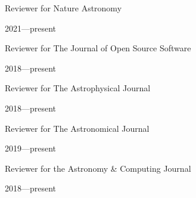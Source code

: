 \documentclass[12pt, a4paper]{article} %
\begin{document}
\vspace{0.2cm}

\begin{minipage}[t]{0.7\textwidth}
\begin{flushleft}%
  \setlength{\leftskip}{0.2cm}%
Reviewer for Nature Astronomy
\end{flushleft}
\end{minipage}
\begin{minipage}[t]{0.3\textwidth}
\hfill 2021---present
\end{minipage}

\vspace{0.2cm}

\begin{minipage}[t]{0.7\textwidth}
\begin{flushleft}%
  \setlength{\leftskip}{0.2cm}%
Reviewer for The Journal of Open Source Software
\end{flushleft}
\end{minipage}
\begin{minipage}[t]{0.3\textwidth}
\hfill 2018---present
\end{minipage}

\vspace{0.2cm}

\begin{minipage}[t]{0.7\textwidth}
\begin{flushleft}%
  \setlength{\leftskip}{0.2cm}%
Reviewer for The Astrophysical Journal
\end{flushleft}
\end{minipage}
\begin{minipage}[t]{0.3\textwidth}
\hfill 2018---present
\end{minipage}

\vspace{0.2cm}

\begin{minipage}[t]{0.7\textwidth}
\begin{flushleft}%
  \setlength{\leftskip}{0.2cm}%
Reviewer for The Astronomical Journal
\end{flushleft}
\end{minipage}
\begin{minipage}[t]{0.3\textwidth}
\hfill 2019---present
\end{minipage}

\vspace{0.2cm}

\begin{minipage}[t]{0.7\textwidth}
\begin{flushleft}%
  \setlength{\leftskip}{0.2cm}%
Reviewer for the Astronomy \& Computing Journal
\end{flushleft}
\end{minipage}
\begin{minipage}[t]{0.3\textwidth}
\hfill 2018---present
\end{minipage}
\end{document}
